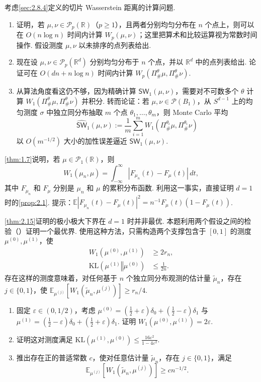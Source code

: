 \begin{exercise}\label{exer:2.5}
考虑\autoref{sec:2.8.4}定义的切片 Wasserstein 距离的计算问题.
\begin{enumerate}
\item[(a)] 证明，若 $\mu,\nu\in\mathcal P_p(\mathbb R)$（$p\ge1$），且两者分别均匀分布在 $n$ 个点上，则可以在 $O(n\log n)$ 时间内计算 $W_p(\mu,\nu)$；这里把算术和比较运算视为常数时间操作. 假设测度 $\mu,\nu$ 以未排序的点列表给出.
\item[(b)] 现在设 $\mu,\nu\in\mathcal P_p(\mathbb R^d)$ 分别均匀分布于 $n$ 个点，并以 $\mathbb R^d$ 中的点列表给出. 论证可在 $O(dn+n\log n)$ 时间内计算 $W_p(\Pi^\theta_\#\mu,\Pi^\theta_\#\nu)$.
\item[(c)] 从算法角度看这仍不够，因为精确计算 $\mathsf{SW}_1(\mu,\nu)$，需要对不可数多个 $\theta$ 计算 $W_1(\Pi^\theta_\#\mu,\Pi^\theta_\#\nu)$ 并积分. 转而论证：若 $\mu,\nu\in\mathcal P(B_1)$，从 $S^{d-1}$ 上的均匀测度 $\sigma$ 中独立同分布抽取 $m$ 个点 $\theta_1,\ldots,\theta_m$，则 Monte Carlo 平均
$$\widehat{\mathsf{SW}}_1(\mu,\nu):=\frac1m\sum_{i=1}^m W_1(\Pi^{\theta_i}_\#\mu,\Pi^{\theta_i}_\#\nu)$$
以 $O(m^{-1/2})$ 大小的加性误差逼近 $\mathsf{SW}_1(\mu,\nu)$.
\end{enumerate}
\end{exercise}

\begin{exercise}\label{exer:2.6}
\autoref{thm:1.7}说明，若 $\mu\in\mathcal P_1(\mathbb R)$，则
$$W_1(\mu_n,\mu)=\int_{-\infty}^{\infty}|F_{\mu_n}(t)-F_\mu(t)|\,dt,$$
其中 $F_{\mu_n}$ 和 $F_\mu$ 分别是 $\mu_n$ 和 $\mu$ 的累积分布函数. 利用这一事实，直接证明 $d=1$ 时的\autoref{prop:2.1}. 提示：$\mathbb E|F_{\mu_n}(t)-F_\mu(t)|^2=n^{-1}F_\mu(t)(1-F_\mu(t))$.
\end{exercise}

\begin{exercise}\label{exer:2.7}
\autoref{thm:2.15}证明的极小极大下界在 $d=1$ 时并非最优. 本题利用两个假设之间的检验（\cite[定理2.2]{ref302}）证明一个最优界. 使用这种方法，只需构造两个支撑包含于 $[0,1]$ 的测度 $\mu^{(0)},\mu^{(1)}$，使
$$\begin{aligned}
W_1(\mu^{(0)},\mu^{(1)})&\ge2r_n,\\
\mathrm{KL}(\mu^{(1)}\mathbin\Vert\mu^{(0)})&\le\frac1{2n}.
\end{aligned}$$
存在这样的测度意味着，对任何基于 $n$ 个独立同分布观测的估计量 $\tilde\mu_n$，存在 $j\in\{0,1\}$，使 $\mathbb E_{\mu^{(j)}}[W_1(\tilde\mu_n,\mu^{(j)})]\ge r_n/4$.
\begin{enumerate}
\item[(a)] 固定 $\varepsilon\in(0,1/2)$，考虑 $\mu^{(0)}=(\frac12+\varepsilon)\delta_0+(\frac12-\varepsilon)\delta_1$ 与 $\mu^{(1)}=(\frac12-\varepsilon)\delta_0+(\frac12+\varepsilon)\delta_1$. 证明 $W_1(\mu^{(0)},\mu^{(1)})=2\varepsilon$.
\item[(b)] 证明这对测度满足 $\mathrm{KL}(\mu^{(1)},\mu^{(0)})\le\frac{16\varepsilon^2}{1-4\varepsilon^2}$.
\item[(c)] 推出存在正的普适常数 $c$，使对任意估计量 $\tilde\mu_n$，存在 $j\in\{0,1\}$，满足
$$\mathbb E_{\mu^{(j)}}[W_1(\tilde\mu_n,\mu^{(j)})]\ge cn^{-1/2}.$$
\end{enumerate}
\end{exercise}

